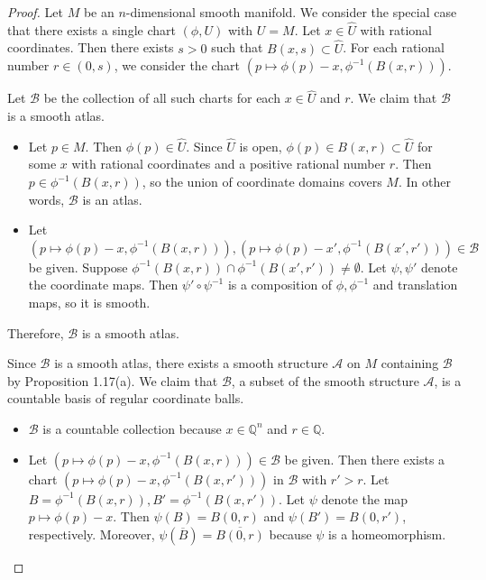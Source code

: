 \begin{proof}
  Let $M$ be an $n$-dimensional smooth manifold.
  We consider the special case that there exists a single chart $(\phi, U)$ with $U = M$.
  Let $x \in \hat{U}$ with rational coordinates.
  Then there exists $s > 0$ such that $B(x, s) \subset \hat{U}$.
  For each rational number $r \in (0, s)$, we consider the chart $(p \mapsto \phi(p) - x, \phi^{-1}(B(x, r)))$.

  Let $\mathcal{B}$ be the collection of all such charts for each $x \in \hat{U}$ and $r$.
  We claim that $\mathcal{B}$ is a smooth atlas.
  \begin{itemize}
    \item
      Let $p \in M$.
      Then $\phi(p) \in \hat{U}$.
      Since $\hat{U}$ is open, $\phi(p) \in B(x, r) \subset \hat{U}$ for some $x$ with rational coordinates and a positive rational number $r$.
      Then $p \in \phi^{-1}(B(x, r))$, so the union of coordinate domains covers $M$.
      In other words, $\mathcal{B}$ is an atlas.
    \item
      Let $(p \mapsto \phi(p) - x, \phi^{-1}(B(x, r))), (p \mapsto \phi(p) - x', \phi^{-1}(B(x', r'))) \in \mathcal{B}$ be given.
      Suppose $\phi^{-1}(B(x, r)) \cap \phi^{-1}(B(x', r')) \ne \emptyset$.
      Let $\psi, \psi'$ denote the coordinate maps.
      Then $\psi' \circ \psi^{-1}$ is a composition of $\phi, \phi^{-1}$ and translation maps, so it is smooth.
  \end{itemize}
  Therefore, $\mathcal{B}$ is a smooth atlas.

  Since $\mathcal{B}$ is a smooth atlas, there exists a smooth structure $\mathcal{A}$ on $M$ containing $\mathcal{B}$ by Proposition 1.17(a).
  We claim that $\mathcal{B}$, a subset of the smooth structure $\mathcal{A}$, is a countable basis of regular coordinate balls.

  \begin{itemize}
    \item
      $\mathcal{B}$ is a countable collection because $x \in \mathbb{Q}^n$ and $r \in \mathbb{Q}$.
    \item
      Let $(p \mapsto \phi(p) - x, \phi^{-1}(B(x, r))) \in \mathcal{B}$ be given.
      Then there exists a chart $(p \mapsto \phi(p) - x, \phi^{-1}(B(x, r')))$ in $\mathcal{B}$ with $r' > r$.
      Let $B = \phi^{-1}(B(x, r)), B' = \phi^{-1}(B(x, r'))$.
      Let $\psi$ denote the map $p \mapsto \phi(p) - x$.
      Then $\psi(B) = B(0, r)$ and $\psi(B') = B(0, r')$, respectively.
      Moreover, $\psi(\overline{B}) = \overline{B(0, r)}$ because $\psi$ is a homeomorphism.
  \end{itemize}

\end{proof}

